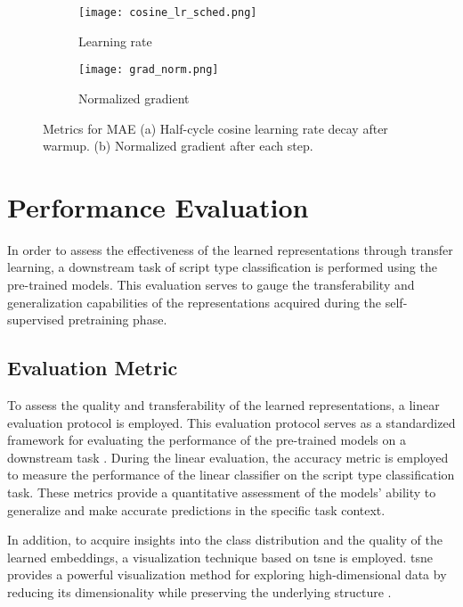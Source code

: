\begin{figure}
	\centering
	\begin{subfigure}[b]{0.3\textwidth}
		\centering
		\texttt{[image: cosine\_lr\_sched.png]}
		\caption{Learning rate}
	\end{subfigure}
	\hspace{10pt}
	\begin{subfigure}[b]{0.3\textwidth}
		\centering
		\texttt{[image: grad\_norm.png]}
		\caption{Normalized gradient}
	\end{subfigure}
	\caption[Metrics monitored for MAE]{Metrics for MAE (a) Half-cycle cosine learning rate decay after warmup. (b) Normalized gradient after each step.}
    \label{fig:lr_sched_grad}
\end{figure}

\section{Performance Evaluation}

In order to assess the effectiveness of the learned representations through transfer learning, a downstream task of script type classification is performed using the pre-trained models. This evaluation serves to gauge the transferability and generalization capabilities of the representations acquired during the self-supervised pretraining phase.

\subsection{Evaluation Metric}

To assess the quality and transferability of the learned representations, a linear evaluation protocol is employed. This evaluation protocol serves as a standardized framework for evaluating the performance of the pre-trained models on a downstream task \cite{kocaman_saliency_2022}. During the linear evaluation, the accuracy metric is employed to measure the performance of the linear classifier on the script type classification task. These metrics provide a quantitative assessment of the models’ ability to generalize and make accurate predictions in the specific task context.

In addition, to acquire insights into the class distribution and the quality of the learned embeddings, a visualization technique based on \acrfull{tsne} is employed. \gls{tsne} provides a powerful visualization method for exploring high-dimensional data by reducing its dimensionality while preserving the underlying structure \cite{maaten_visualizing_2008}.

